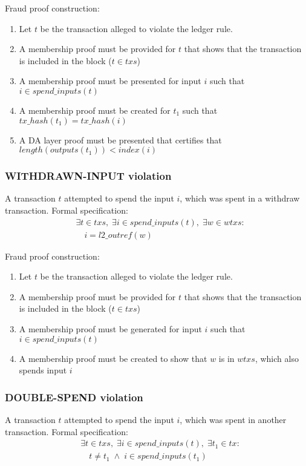 \documentclass[../midgard.tex]{subfiles}
\begin{document}
Fraud proof construction:
\begin{enumerate}
  \item Let $t$ be the transaction alleged to violate the ledger rule. 
  \item A membership proof must be provided for $t$ that shows that the transaction is included in the block ($t \in txs$)
  \item A membership proof must be presented for input $i$ such that $i \in spend\_inputs(t)$
  \item A membership proof must be created for $t_1$ such that $tx\_hash(t_1) = tx\_hash(i)$
  \item A DA layer proof must be presented that certifies that $length(outputs(t_1)) < index(i)$
\end{enumerate}

\subsubsection{WITHDRAWN-INPUT violation}
\label{violation:WITHDRAWN-INPUT}
A transaction $t$ attempted to spend the input $i$, which was spent in a withdraw transaction.
Formal specification:
\begin{equation*}
\begin{split}
  &\exists t \in txs,\; \exists i \in spend\_inputs(t),\; \exists w \in wtxs:\\
    &\quad i = l2\_outref(w)
\end{split}
\end{equation*}

Fraud proof construction:
\begin{enumerate}
  \item Let $t$ be the transaction alleged to violate the ledger rule. 
  \item A membership proof must be provided for $t$ that shows that the transaction is included in the block ($t \in txs$)
  \item A membership proof must be generated for input $i$ such that $i \in spend\_inputs(t)$
  \item A membership proof must be created to show that $w$ is in $wtxs$, which also spends input $i$
\end{enumerate}

\subsubsection{DOUBLE-SPEND violation}
\label{violation:DOUBLE-SPEND}
A transaction $t$ attempted to spend the input $i$, which was spent in another transaction.
Formal specification:
\begin{equation*}
\begin{split}
  &\exists t \in txs,\; \exists i \in spend\_inputs(t),\; \exists t_1 \in tx:\\
    &\quad
      t \neq t_1 \;\land\;
      i \in spend\_inputs(t_1)
\end{split}
\end{equation*}
\end{document}
